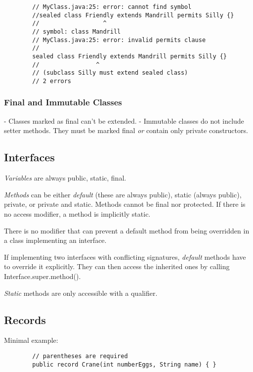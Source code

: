 \documentclass{scrartcl}
\begin{document}
    \begin{lstlisting}
        // MyClass.java:25: error: cannot find symbol
        //sealed class Friendly extends Mandrill permits Silly {}
        //                  ^
        // symbol: class Mandrill
        // MyClass.java:25: error: invalid permits clause
        //
        sealed class Friendly extends Mandrill permits Silly {}
        //                ^
        // (subclass Silly must extend sealed class)
        // 2 errors
    \end{lstlisting}
\subsubsection{Final and Immutable Classes}

    - Classes marked as final can’t be extended.
    - Immutable classes do not include setter methods. They must be marked final \textit{or} contain only private constructors.

\subsection{Interfaces}

    \textit{Variables} are always public, static, final.

    \textit{Methods} can be either \textit{default} (these are always public), static (always public), private, or private and static.
    Methods cannot be final nor protected. If there is no access modifier, a method is implicitly static.

    There is no modifier that can prevent a default method from being overridden in a class implementing an interface.

    If implementing two interfaces with conflicting signatures, \textit{default} methods have to override it explicitly. They  can then access the inherited ones by calling Interface.super.method().

    \textit{Static} methods are only accessible with a qualifier.

\subsection{Records}

    Minimal example:

    \begin{lstlisting}
        // parentheses are required
        public record Crane(int numberEggs, String name) { }
    \end{lstlisting}
\end{document}
